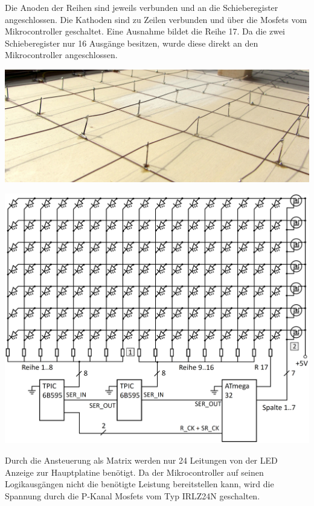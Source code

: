 Die Anoden der Reihen sind jeweils verbunden und an die Schieberegister
angeschlossen. Die Kathoden sind zu Zeilen verbunden und über die Mosfets vom
Mikrocontroller geschaltet. Eine Ausnahme bildet die Reihe 17. Da die zwei
Schieberegister nur 16 Ausgänge besitzen, wurde diese direkt an den Mikrocontroller
angeschlossen.
\begin{center}
	\includegraphics[width=\textwidth]{images/unterseite_drahtgitter.jpg} 
\end{center}
\label{led_matrix_verdrahtung}

\begin{center}
	\includegraphics[width=\textwidth]{skizzen/led_matrix_schaltplan.png} 
\end{center}
\label{led_matrix_schaltplan}

Durch die Ansteuerung als Matrix werden nur 24 Leitungen von der LED Anzeige zur
Hauptplatine benötigt. Da der Mikrocontroller auf seinen Logikausgängen nicht
die benötigte Leistung bereitstellen kann, wird die Spannung durch die P-Kanal
Mosfets vom Typ IRLZ24N geschalten.

